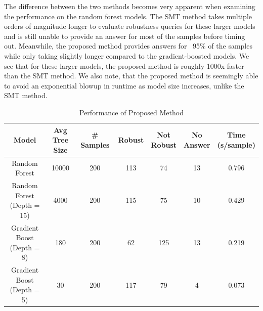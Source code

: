 \documentclass[pageno]{jpaper}
\begin{document}
\begin{doublespacing}
The difference between the two methods becomes very apparent when examining the performance on the random forest models. The SMT method takes multiple orders of magnitude longer to evaluate robustness queries for these larger models and is still unable to provide an answer for most of the samples before timing out. Meanwhile, the proposed method provides answers for ~95\% of the samples while only taking slightly longer compared to the gradient-boosted models. We see that for these larger models, the proposed method is roughly 1000x faster than the SMT method. We also note, that the proposed method is seemingly able to avoid an exponential blowup in runtime as model size increases, unlike the SMT method.

\begin{table}[h]
\centering
\begin{tabular}{| c | c c c c c c |} 
 \hline
 Model & \makecell{Avg Tree \\ Size} & \# Samples & Robust & \makecell{Not \\ Robust} & \makecell{No \\ Answer} & \makecell{Time  \\ (s/sample)} \\ [0.5ex] 
 \hline\hline
Random Forest 					& 10000 & 200 & 113 & 74 & 13 & 0.796 \\ \hline
\makecell{Random Forest \\ (Depth = 15)} & 4000 & 200 & 115 & 75 & 10 & 0.429 \\ \hline
\makecell{Gradient Boost \\ (Depth = 8)}	& 180  & 200 & 62 & 125 & 13 & 0.219 \\ \hline
\makecell{Gradient Boost \\ (Depth = 5)} 	& 30  & 200 & 117 & 79 & 4 & 0.073 \\ [1ex] 
 \hline
\end{tabular}
\caption{Performance of Proposed Method}
\label{table:my-method}
\end{table}


\end{doublespacing}
\end{document}
